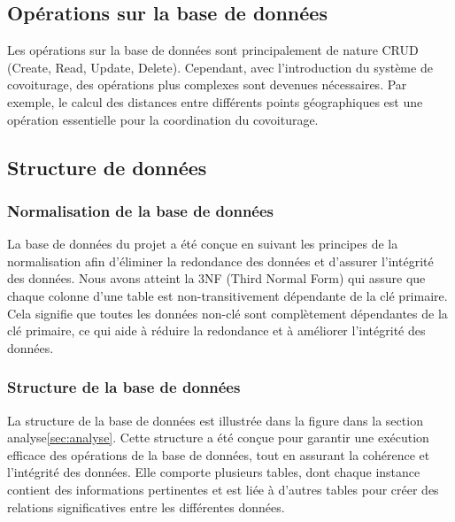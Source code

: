\subsection{Opérations sur la base de données}\label{subsec:operation-sur-la-base-de-donnees}
Les opérations sur la base de données sont principalement de nature CRUD (Create, Read, Update, Delete).
Cependant, avec l'introduction du système de covoiturage, des opérations plus complexes sont devenues nécessaires.
Par exemple, le calcul des distances entre différents points géographiques est une opération essentielle pour la coordination du covoiturage.\\

\subsection{Structure de données}\label{subsec:structure-de-donnees}

\subsubsection{Normalisation de la base de données}\label{subsubsec:normalisation}
La base de données du projet a été conçue en suivant les principes de la normalisation afin d'éliminer la redondance des données et d'assurer l'intégrité des données.
Nous avons atteint la 3NF (Third Normal Form) qui assure que chaque colonne d'une table est non-transitivement dépendante de la clé primaire.
Cela signifie que toutes les données non-clé sont complètement dépendantes de la clé primaire, ce qui aide à réduire la redondance et à améliorer l'intégrité des données.\\

\subsubsection{Structure de la base de données}
La structure de la base de données est illustrée dans la figure dans la section analyse\ref{sec:analyse}.
Cette structure a été conçue pour garantir une exécution efficace des opérations de la base de données, tout en assurant la cohérence et l'intégrité des données.
Elle comporte plusieurs tables, dont chaque instance contient des informations pertinentes et est liée à d'autres tables pour créer des relations significatives entre les différentes données.\\

